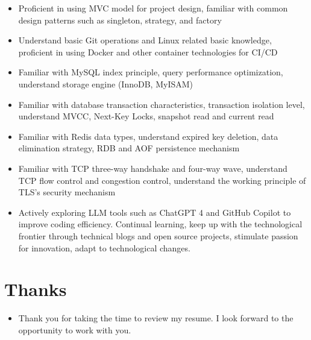 \documentclass{resume}
\newcommand{\en}[1]{#1}
\newcommand{\zh}[1]{}
\begin{document}
\begin{itemize}[parsep=0.25ex]
      \item \en{Proficient in using MVC model for project design, familiar with common design patterns such as singleton, strategy, and factory}
            \zh{熟练使用 MVC 模式进行项目设计，熟悉单例，策略，工厂模式等常见的设计模式}

      \item \en{Understand basic Git operations and Linux related basic knowledge, proficient in using Docker and other container technologies for CI/CD}
            \zh{了解Git基本操作以及Linux相关基本知识，熟练使用Docker等容器技术进行CI/CD}

      \item \en{Familiar with MySQL index principle, query performance optimization, understand storage engine (InnoDB, MyISAM)}
            \zh{熟悉 MySQL 索引原理、查询性能优化，了解存储引擎 (InnoDB、MyISAM)}

      \item \en{Familiar with database transaction characteristics, transaction isolation level, understand MVCC, Next-Key Locks, snapshot read and current read}
            \zh{熟悉数据库事务特性、事务隔离级别，了解 MVCC、Next-Key Locks、快照读与当前读}

      \item \en{Familiar with Redis data types, understand expired key deletion, data elimination strategy, RDB and AOF persistence mechanism}
            \zh{熟悉 Redis 数据类型，了解过期键删除、数据淘汰策略、RDB 和 AOF 持久化机制}

      \item \en{Familiar with TCP three-way handshake and four-way wave, understand TCP flow control and congestion control, understand the working principle of TLS's security mechanism}
            \zh{熟悉 TCP 三次握手和四次挥手，了解 TCP 流量控制和拥塞控制，了解 TLS的安全机制的工作原理}

      \item \en{Actively exploring LLM tools such as ChatGPT 4 and GitHub Copilot to improve coding efficiency. Continual learning, keep up with the technological frontier through technical blogs and open source projects, stimulate passion for innovation, adapt to technological changes.}
            \zh{积极探索如ChatGPT 4和GitHub Copilot等LLM工具，提升编码效率。持续学习，通过技术博客、开源项目保持技术前沿，激发创新热情，适应技术变革。}
\end{itemize}

\section{\en{Thanks}\zh{致谢}}
\begin{itemize}
      \item \en{Thank you for taking the time to review my resume. I look forward to the opportunity to work with you.}
            \zh{感谢您花时间阅读我的简历，期待能有机会和您共事}
\end{itemize}
\end{document}
